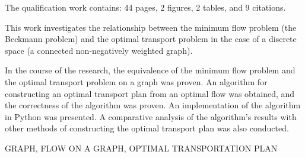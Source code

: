 \abstractEng
The qualification work contains: 44 pages, 2 figures, 2 tables, and 9 citations.

This work investigates the relationship between the minimum flow problem (the Beckmann problem) and 
the optimal transport problem in the case of a discrete space (a connected non-negatively weighted graph).

In the course of the research, the equivalence of the minimum flow problem and the optimal transport problem on a graph was proven. An algorithm for constructing an optimal transport plan from an optimal flow was obtained, and the correctness of the algorithm was proven.
An implementation of the algorithm in Python was presented. A comparative analysis of the algorithm's results with other
methods of constructing the optimal transport plan was also conducted.

\MakeUppercase{GRAPH, FLOW ON A GRAPH, OPTIMAL TRANSPORTATION PLAN}